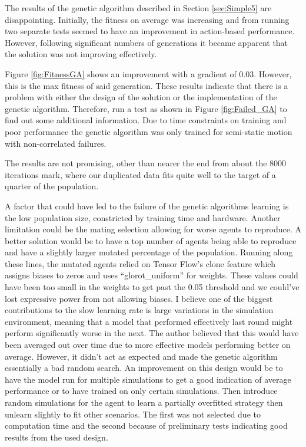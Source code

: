\documentclass{UoYCSproject}
\begin{document}
The results of the genetic algorithm described in Section \ref{sec:Simple5} are disappointing.
Initially, the fitness on average was increasing and from running two separate tests seemed to have an improvement in action-based performance.
However, following significant numbers of generations it became apparent that the solution was not improving effectively.

Figure \ref{fig:FitnessGA} shows an improvement with a gradient of 0.03.
However, this is the max fitness of said generation.
These results indicate that there is a problem with either the design of the solution or the implementation of the genetic algorithm.
Therefore, run a test as shown in Figure \ref{fig:Failed_GA} to find out some additional information.
Due to time constraints on training and poor performance the genetic algorithm was only trained for semi-static motion with non-correlated failures.

The results are not promising, other than nearer the end from about the 8000 iterations mark, where our duplicated data fits quite well to the target of a quarter of the population.

A factor that could have led to the failure of the genetic algorithms learning is the low population size, constricted by training time and hardware.
Another limitation could be the mating selection allowing for worse agents to reproduce.
A better solution would be to have a top number of agents being able to reproduce and have a slightly larger mutated percentage of the population.
Running along these lines, the mutated agents relied on Tensor Flow's clone feature which assigns biases to zeros and uses “glorot\_uniform” for weights.
These values could have been too small in the weights to get past the 0.05 threshold and we could’ve lost expressive power from not allowing biases.
I believe one of the biggest contributions to the slow learning rate is large variations in the simulation environment, meaning that a model that performed effectively last round might perform significantly worse in the next.
The author believed that this would have been averaged out over time due to more effective models performing better on average.
However, it didn’t act as expected and made the genetic algorithm essentially a bad random search.
An improvement on this design would be to have the model run for multiple simulations to get a good indication of average performance or to have trained on only certain simulations.
Then introduce random simulations for the agent to learn a partially overfitted strategy then unlearn slightly to fit other scenarios.
The first was not selected due to computation time and the second because of preliminary tests indicating good results from the used design.
\end{document}
